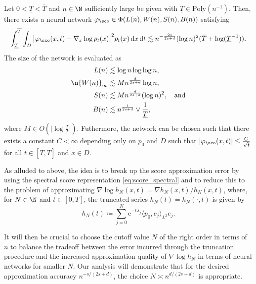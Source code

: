 \documentclass[a4paper, 11pt, headings = small, abstract]{scrartcl}
\begin{document}
\begin{theorem}
\label{theorem:approx_nabla_log_h_N}
Let $0<\underline{T}<\overline{T}$ and $n\in\N$ sufficiently large be given with $\underline{T}\in\mathrm{Poly}(n^{-1})$. 
Then, there exists a neural network $\varphi_{\sco}\in\Phi(L(n), W(n), S(n), B(n))$ satisfying
\begin{equation}
\label{eq:err_rate_score_approximation}
\int_{\underline{T}}^{\overline{T}}\int_D
\big|\varphi_{\sco}(x,t)-\nabla_x\log p_t(x)\big|^2p_t(x)\,\mathrm{d}x\,\mathrm{d}t
\lesssim n^{-\frac{2s}{2s+d}}(\log n)^2(\overline{T}+\log(\underline{T}^{-1})).
\end{equation}
The size of the network is evaluated as 
\begin{align*}
L(n)
&\lesssim\log n\log\log n, \\
\n{W(n)}_{\infty}
&\lesssim M n^\frac{d}{2s+d}\log n, \\
S(n)
&\lesssim M n^\frac{d}{2s+d}(\log n)^2,\quad\text{and} \\
B(n)
&\lesssim n^{\frac{1}{2s+d}}\vee\frac{1}{\underline{T}},
\end{align*}
where $M\in O(\lvert\log\tfrac{\overline{T}}{\underline{T}}\rvert)$. 
Futhermore, the network can be chosen such that there exists a constant $C<\infty$ depending only on $p_0$ and $D$ such that $|\varphi_\sco(x, t)|\le \frac{C}{\sqrt{t}}$ for all $t\in[\underline{T}, \overline{T}]$ and $x\in D$.
\end{theorem}

As alluded to above, the idea is to break up the score approximation error by using the spectral score representation \eqref{eq:score_spectral} and to reduce this to the problem of approximating  $\nabla \log h_N(x,t) = \nabla h_N(x,t)/h_N(x,t)$, where, for $N \in \N$ and $t \in [0,T]$, the truncated series $h_N(t) = h_N(\cdot, t)$ is given by 
\begin{equation}
    \label{eq:hN_def}
    h_N(t) \coloneqq \sum_{j=0}^N \mathrm{e}^{-t\lambda_j} \langle p_0,e_j \rangle_{L^2} e_j.
\end{equation} 

It will then be crucial to choose the cutoff value $N$ of the right order in terms of $n$ to balance the tradeoff between the error incurred through the truncation procedure and the increased approximation quality of $\nabla \log h_N$ in terms of neural networks for smaller $N$. Our analysis will demonstrate that for the desired approximation accuracy $n^{-s/(2s+d)}$, the choice $N \asymp n^{d/(2s+d)}$ is appropriate.
\end{document}
